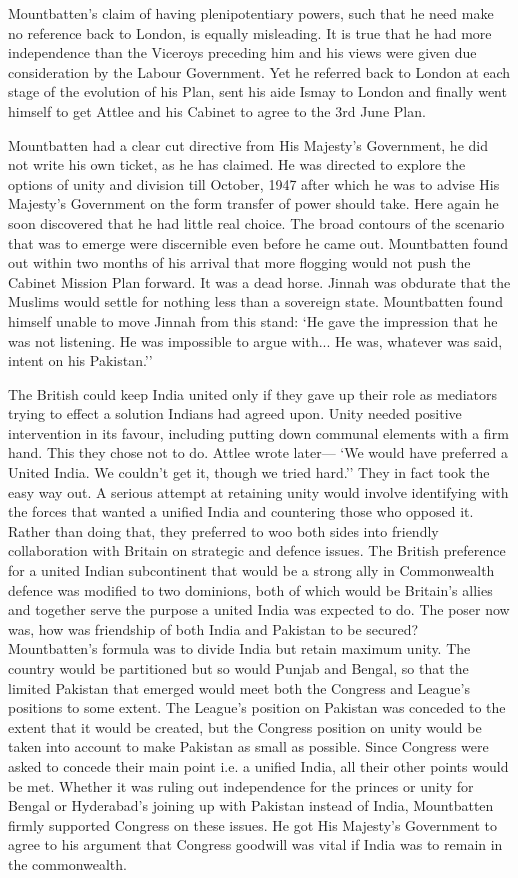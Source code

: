 Mountbatten's claim of having plenipotentiary powers, such that he need make no reference back to London, is equally misleading. It is true that he had more independence than the Viceroys preceding him and his views were given due consideration by the Labour Government. Yet he referred back to London at each stage of the evolution of his Plan, sent his aide Ismay to London and finally went himself to get Attlee and his Cabinet to agree to the 3rd June Plan. 

Mountbatten had a clear cut directive from His Majesty's Government, he did not write his own ticket, as he has claimed. He was directed to explore the options of unity and division till October, 1947 after which he was to advise His Majesty's Government on the form transfer of power should take. Here again he soon discovered that he had little real choice. The broad contours of the scenario that was to emerge were discernible even before he came out. Mountbatten found out within two months of his arrival that more flogging would not push the Cabinet Mission Plan forward. It was a dead horse. Jinnah was obdurate that the Muslims would settle for nothing less than a sovereign state. Mountbatten found himself unable to move Jinnah from this stand: `He gave the impression that he was not listening. He was impossible to argue with... He was, whatever was said, intent on his Pakistan.'' 

The British could keep India united only if they gave up their role as mediators trying to effect a solution Indians had agreed upon. Unity needed positive intervention in its favour, including putting down communal elements with a firm hand. This they chose not to do. Attlee wrote later— `We would have preferred a United India. We couldn't get it, though we tried hard.'' They in fact took the easy way out. A serious attempt at retaining unity would involve identifying with the forces that wanted a unified India and countering those who opposed it. Rather than doing that, they preferred to woo both sides into friendly collaboration with Britain on strategic and defence issues. The British preference for a united Indian subcontinent that would be a strong ally in Commonwealth defence was modified to two dominions, both of which would be Britain's allies and together serve the purpose a united India was expected to do. The poser now was, how was friendship of both India and Pakistan to be secured? Mountbatten's formula was to divide India but retain maximum unity. The country would be partitioned but so would Punjab and Bengal, so that the limited Pakistan that emerged would meet both the Congress and League's positions to some extent. The League's position on Pakistan was conceded to the extent that it would be created, but the Congress position on unity would be taken into account to make Pakistan as small as possible. Since Congress were asked to concede their main point i.e. a unified India, all their other points would be met. Whether it was ruling out independence for the princes or unity for Bengal or Hyderabad's joining up with Pakistan instead of India, Mountbatten firmly supported Congress on these issues. He got His Majesty's Government to agree to his argument that Congress goodwill was vital if India was to remain in the commonwealth. 

